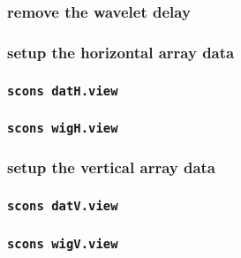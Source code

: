 \begin{frame}  \end{frame}
\begin{frame}  \end{frame}
\begin{frame}  \end{frame}
\begin{frame}  \end{frame}
\begin{frame}  \end{frame}
\begin{frame}  \end{frame}
\begin{frame}  \end{frame}

\begin{frame} \frametitle{remove the wavelet delay}
\end{frame}
\cwpnote{}

\begin{frame} \frametitle{setup the horizontal array data}
\end{frame}
\cwpnote{}

\begin{frame} \frametitle{\texttt{scons datH.view}}
\end{frame}
\begin{frame} \frametitle{\texttt{scons wigH.view}}
\end{frame}

\begin{frame} \frametitle{setup the vertical array data}
\end{frame}
\cwpnote{}

\begin{frame} \frametitle{\texttt{scons datV.view}}
\end{frame}
\begin{frame} \frametitle{\texttt{scons wigV.view}}
\end{frame}

